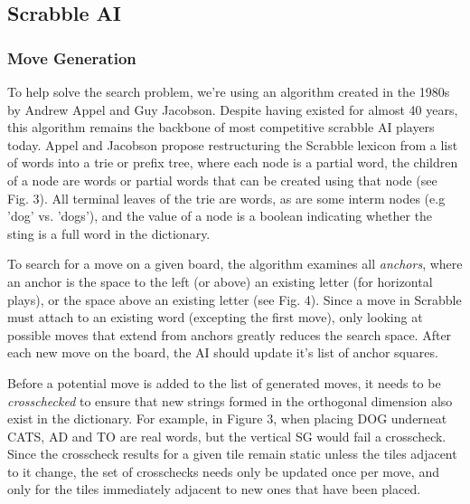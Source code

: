 \documentclass[12pt]{article}
\begin{document}
\subsection*{Scrabble AI}
\subsubsection*{Move Generation}
To help solve the search problem, we're using an algorithm created in
the 1980s by Andrew Appel and Guy Jacobson. Despite having existed for almost 40 years, this algorithm remains the backbone
of most competitive scrabble AI players today. Appel and Jacobson
propose restructuring the Scrabble lexicon from a list of words into a
trie or prefix tree, where each node is a partial word, the children
of a node are words or partial words that can be created using that
node (see Fig. 3). All terminal leaves of the trie are words, as are
some interm nodes (e.g 'dog' vs. 'dogs'), and the value of a node is a
boolean indicating whether the sting is a full word in the dictionary.
  
To search for a move on a given board, the algorithm examines all
\emph{anchors}, where an anchor is the space to the left (or above) an
existing letter (for horizontal plays), or the space above an existing
letter (see Fig. 4). Since a move in Scrabble must attach to an
existing word (excepting the first move), only looking at possible
moves that extend from anchors greatly reduces the search space. After
each new move on the board, the AI should update it's list of anchor
squares.

Before a potential move is added to the list of generated moves, it
needs to be \emph{crosschecked} to ensure that new strings formed in
the orthogonal dimension also exist in the dictionary. For example, in Figure 3, when placing DOG underneat CATS, AD and TO are real words, but the vertical SG would fail a crosscheck.  Since the crosscheck
results for a given tile remain static unless the tiles adjacent to it
change, the set of crosschecks needs only be updated once per move,
and only for the tiles immediately adjacent to new ones that have been
placed.
\end{document}
